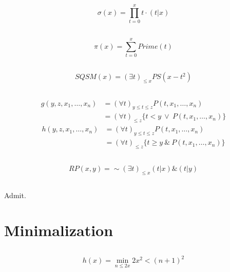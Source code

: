 \subsection{}
\[ \sigma(x) = \prod_{t=0}^{x}{t\cdot(t|x)} \]

\subsection{}
\[ \pi(x) = \sum_{t=0}^{x}{Prime(t)} \]

\subsection{}
\[ SQSM(x) = (\exists t)_{\le x} PS(x - t^2) \]

\subsection{}
\[ \begin{array}{rl}
    g(y,z,x_{1},\dots ,x_{n})
  & = (\forall t)_{y\le t\le z}P(t,x_{1},\dots,x_{n}) \\
  & = (\forall t)_{\le z}\{ t<y \ \lor\ P(t,x_{1},\dots,x_{n}) \}
\end{array}\] \[ \begin{array}{rl}
    h(y,z,x_{1},\dots ,x_{n})
  & = (\forall t)_{y\le t\le z}P(t,x_{1},\dots,x_{n}) \\
  & = (\forall t)_{\le z}\{ t\ge y \ \&\ P(t,x_{1},\dots,x_{n}) \}
\end{array}\]

\subsection{}
\[ RP(x,y) = \sim (\exists t)_{\le x}(t|x)\&(t|y) \]

\subsection{}
Admit.



\section{Minimalization}

\subsection{}
\[ h(x) = \min_{n\le 2x}{2x^2<(n+1)^2} \]

